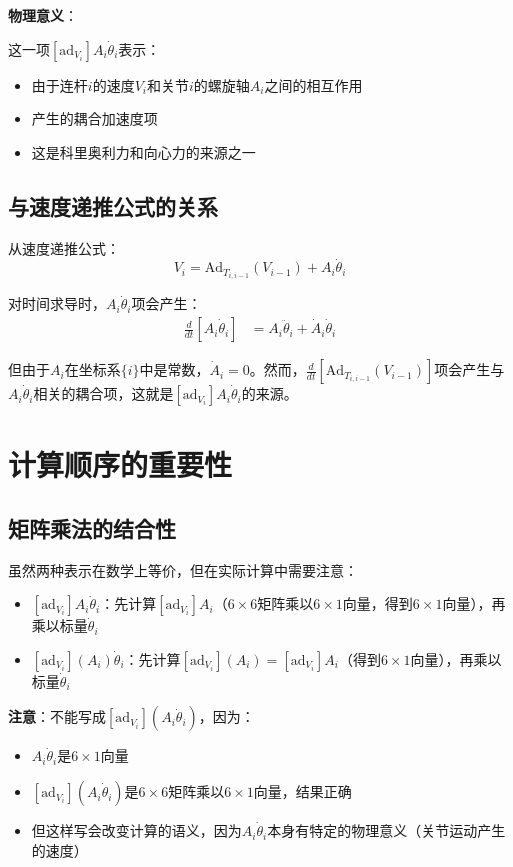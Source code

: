 \documentclass[12pt,a4paper]{article}
\begin{document}
\textbf{物理意义}：

这一项$[\text{ad}_{V_i}] A_i \dot{\theta}_i$表示：
\begin{itemize}
\item 由于连杆$i$的速度$V_i$和关节$i$的螺旋轴$A_i$之间的相互作用
\item 产生的耦合加速度项
\item 这是科里奥利力和向心力的来源之一
\end{itemize}

\subsection{与速度递推公式的关系}

从速度递推公式：
\begin{equation}
V_i = \text{Ad}_{T_{i,i-1}}(V_{i-1}) + A_i \dot{\theta}_i
\end{equation}

对时间求导时，$A_i \dot{\theta}_i$项会产生：
\begin{align}
\frac{d}{dt}[A_i \dot{\theta}_i] &= A_i \ddot{\theta}_i + \dot{A}_i \dot{\theta}_i
\end{align}

但由于$A_i$在坐标系$\{i\}$中是常数，$\dot{A}_i = 0$。然而，$\frac{d}{dt}[\text{Ad}_{T_{i,i-1}}(V_{i-1})]$项会产生与$A_i \dot{\theta}_i$相关的耦合项，这就是$[\text{ad}_{V_i}] A_i \dot{\theta}_i$的来源。

\section{计算顺序的重要性}

\subsection{矩阵乘法的结合性}

虽然两种表示在数学上等价，但在实际计算中需要注意：

\begin{itemize}
\item $[\text{ad}_{V_i}] A_i \dot{\theta}_i$：先计算$[\text{ad}_{V_i}] A_i$（$6 \times 6$矩阵乘以$6 \times 1$向量，得到$6 \times 1$向量），再乘以标量$\dot{\theta}_i$
\item $[\text{ad}_{V_i}](A_i) \dot{\theta}_i$：先计算$[\text{ad}_{V_i}](A_i) = [\text{ad}_{V_i}] A_i$（得到$6 \times 1$向量），再乘以标量$\dot{\theta}_i$
\end{itemize}

\textbf{注意}：不能写成$[\text{ad}_{V_i}] (A_i \dot{\theta}_i)$，因为：
\begin{itemize}
\item $A_i \dot{\theta}_i$是$6 \times 1$向量
\item $[\text{ad}_{V_i}] (A_i \dot{\theta}_i)$是$6 \times 6$矩阵乘以$6 \times 1$向量，结果正确
\item 但这样写会改变计算的语义，因为$A_i \dot{\theta}_i$本身有特定的物理意义（关节运动产生的速度）
\end{itemize}
\end{document}
